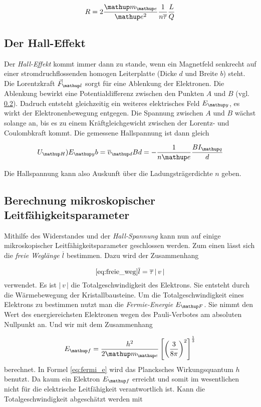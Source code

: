 \begin{equation}
\label{eq:wider}
R=2\frac{\map{m}\ua{e}}{\map{e}^2}\frac{1}{n\overline{\tau}}\frac{L}{Q}
\end{equation}
\subsection{Der Hall-Effekt}
Der \emph{Hall-Effekt} kommt immer dann zu stande, wenn 
ein Magnetfeld senkrecht auf einer stromdruchflossenden 
homogen Leiterplatte (Dicke $d$ und Breite $b$) steht.
Die Lorentzkraft $\vec{F}\ua{l}$ sorgt für eine Ablenkung der Elektronen.
Die Ablenkung bewirkt eine Potentialdifferenz zwischen den 
Punkten $A$ und $B$ (vgl. \ref{}). Dadruch entsteht gleichzeitig ein
weiteres elektrisches Feld $E\ua{y}$, es wirkt der Elektronenbewegung entgegen.
Die Spannung zwischen $A$ und $B$ wächst solange an, bis es zu einem Kräftgleichgewicht zwischen der Lorentz- und Coulombkraft kommt.
Die gemessene Hallspannung ist  dann gleich

\begin{equation}
\label{eq:hall_span}
U\ua{H})E\ua{y}b=\overline{v}\ua{d}Bd=-\frac{1}{n\map{e}}\frac{BI\ua{q}}{d}
\end{equation}

Die Hallspannung kann also Auskunft über die Ladungsträgerdichte $n$ geben.

\subsection{Berechnung mikroskopischer Leitfähigkeitsparameter}
Mithilfe des Widerstandes und der \emph{Hall-Spannung} kann nun auf 
einige mikroskopischer Leitfähigkeitsparameter geschlossen werden.
Zum einen lässt sich die \emph{freie Weglänge} $\overline{l}$ bestimmen.
Dazu wird der Zusammenhang

\begin{equation}
\ref{eq:freie_weg}
\overline{l}=\overline{\tau}\left|\,v\,\right|
\end{equation}
verwendet.
Es ist $\left|\,v\,\right|$ die Totalgeschwindigkeit des Elektrons.
Sie entsteht durch die Wärmebewegung der Kristallbausteine.
Um die Totalgeschwindigkeit eines Elektrons zu bestimmen nutzt 
man die \emph{Fermie-Energie} $E\ua{F}$. Sie nimmt den Wert des energiereichsten Elektronen wegen des 
Pauli-Verbotes am absoluten Nullpunkt an.
Und wir mit dem Zusammenhang 

\begin{equation}
\label{eq:fermi_e}
E\ua{f}=\frac{h^2}{2\map{m}\ua{e}}\left[\left(\frac{3}{8\pi}\right)^2\right]^{\frac{1}{3}}
\end{equation}
berechnet. In Formel \eqref{eq:fermi_e} wird das Plancksches Wirkungsquantum $h$ benutzt.
Da kaum ein Elektron $E\ua{f}$ erreicht und somit im wesentlichen nicht 
für die elektrische Leitfähigkeit verantwortlich ist.
Kann die Totalgeschwindigkeit abgeschätzt werden mit

